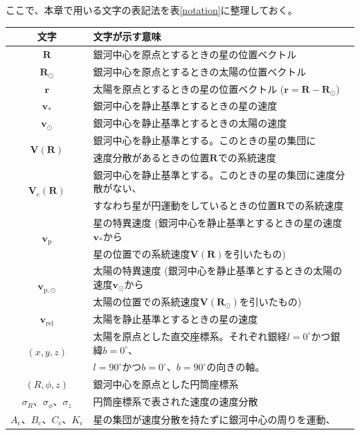 ここで、本章で用いる文字の表記法を表\ref{notation}に整理しておく。
\begin{table}
\begin{center}
\begin{tabular}{c|l} \hline
 \rowcolor{LightCyan}
 文字 & 文字が示す意味\\
 \hline
 $\pmb{R}$ & 銀河中心を原点とするときの星の位置ベクトル\\
 \hline
 $\pmb{R_{\odot}}$ & 銀河中心を原点とするときの太陽の位置ベクトル\\
 \hline
 $\pmb{r}$ & 太陽を原点とするときの星の位置ベクトル ($\pmb{r}=\pmb{R}-\pmb{R_{\odot}}$)\\
 \hline
 $\pmb{v}_*$ & 銀河中心を静止基準とするときの星の速度\\
 \hline
 $\pmb{v}_{\odot}$ & 銀河中心を静止基準とするときの太陽の速度\\
 \hline
 \multirow{2}{*}{$\pmb{V}(\pmb{R})$} & 銀河中心を静止基準とする。このときの星の集団に\\
   & 速度分散があるときの位置$\pmb{R}$での系統速度 \tabularnewline[\doublerulesep]
 \hline
 \multirow{2}{*}{$\pmb{V}_{\mathrm{c}}(\pmb{R})$} & 銀河中心を静止基準とする。このときの星の集団に速度分散がない、\\
   & すなわち星が円運動をしているときの位置$\pmb{R}$での系統速度 \tabularnewline[\doublerulesep]
 \hline
 \multirow{2}{*}{$\pmb{v}_{\mathrm{p}}$} & 星の特異速度 (銀河中心を静止基準とするときの星の速度$\pmb{v}_*$から\\
   & 星の位置での系統速度$\pmb{V}(\pmb{R})$を引いたもの) \tabularnewline[\doublerulesep]
 \hline
 \multirow{2}{*}{$\pmb{v}_{\mathrm{p},\odot}$} & 太陽の特異速度 (銀河中心を静止基準とするときの太陽の速度$\pmb{v}_{\odot}$から\\
   & 太陽の位置での系統速度$\pmb{V}(\pmb{R_{\odot}})$を引いたもの) \tabularnewline[\doublerulesep]
 \hline
 $\pmb{v}_{\mathrm{rel}}$ & 太陽を静止基準とするときの星の速度\\
 \hline
 \multirow{2}{*}{$(x,y,z)$} & 太陽を原点とした直交座標系。それぞれ銀経$l=0^{\circ}$かつ銀緯$b=0^{\circ}$、\\
    & $l=90^{\circ}$かつ$b=0^{\circ}$、$b=90^{\circ}$の向きの軸。 \tabularnewline[\doublerulesep]
 \hline
 $(R,\phi,z)$ & 銀河中心を原点とした円筒座標系\\
 \hline
 $\sigma_R、\sigma_{\phi}、\sigma_z$ & 円筒座標系で表された速度の速度分散\\
 \hline
 \multirow{3}{*}{$A_{\mathrm{c}}、B_{\mathrm{c}}、C_{\mathrm{c}}、K_{\mathrm{c}}$} & 星の集団が速度分散を持たずに銀河中心の周りを運動、\\

\end{tabular}
\end{center}
\end{table}
